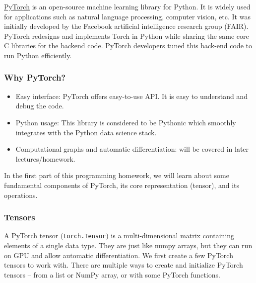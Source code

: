 \href{https://pytorch.org/}{PyTorch} is an open-source machine learning library for Python. It is widely used for applications such as natural language processing, computer vision, etc. It was initially developed by the Facebook artificial intelligence research group (FAIR). PyTorch redesigns and implements Torch in Python while sharing the same core C libraries for the backend code. PyTorch developers tuned this back-end code to run Python efficiently.

\subsubsection{Why PyTorch?}
\begin{itemize}
    \item  Easy interface: PyTorch offers easy-to-use API. It is easy to understand and debug the code.
    \item Python usage: This library is considered to be Pythonic which smoothly integrates with the Python data science stack.
    \item Computational graphs and automatic differentiation: will be covered in later lectures/homework.
\end{itemize}
In the first part of this programming homework, we will learn about some fundamental components of PyTorch, its core representation (tensor), and its operations.

\subsubsection{Tensors}
\noindent A PyTorch tensor (\texttt{torch.Tensor}) is a multi-dimensional matrix containing elements of a single data type. They are just like numpy arrays, but they can run on GPU and allow automatic differentiation. We first create a few PyTorch tensors to work with. There are multiple ways to create and initialize PyTorch tensors -- from a list or NumPy array, or with some PyTorch functions.

